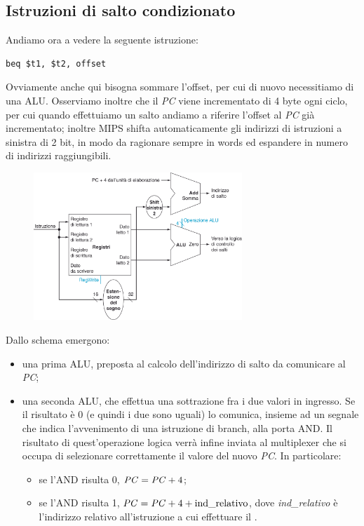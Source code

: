 \documentclass[class=book, crop=false, oneside]{standalone}
\begin{document}
\subsection{Istruzioni di salto condizionato}
Andiamo ora a vedere la seguente istruzione:
\begin{verbatim}
beq $t1, $t2, offset
\end{verbatim}
Ovviamente anche qui bisogna sommare l'offset, per cui di nuovo necessitiamo di una ALU. Osserviamo inoltre che il \emph{PC} viene incrementato di 4 byte ogni ciclo, per cui quando effettuiamo un salto andiamo a riferire l'offset al \emph{PC} già incrementato; inoltre MIPS shifta automaticamente gli indirizzi di istruzioni a sinistra di 2 bit, in modo da ragionare sempre in words ed espandere in numero di indirizzi raggiungibili.
\begin{figure}[H]
	\centering
	\includegraphics[width=0.7\textwidth,keepaspectratio]{jump.png}
\end{figure}
Dallo schema emergono:
\begin{itemize}
	\item una prima ALU, preposta al calcolo dell'indirizzo di salto da comunicare al \emph{PC};
	\item una seconda ALU, che effettua una sottrazione fra i due valori in ingresso. Se il risultato è 0 (e quindi i due sono uguali) lo comunica, insieme ad un segnale che indica l'avvenimento di una istruzione di branch, alla porta AND. Il risultato di quest'operazione logica verrà infine inviata al multiplexer che si occupa di selezionare correttamente il valore del nuovo \emph{PC}. In particolare:
	\begin{itemize}
		\item se l'AND risulta 0, \(\textrm{\emph{PC}}=\textrm{\emph{PC}}+4\);
		\item se l'AND risulta 1, \(\textrm{\emph{PC}}=\textrm{\emph{PC}}+4+\textrm{ind\_relativo}\), dove \emph{ind\_relativo} è l'indirizzo relativo all'istruzione a cui effettuare il .
	\end{itemize}
\end{itemize}
\end{document}
